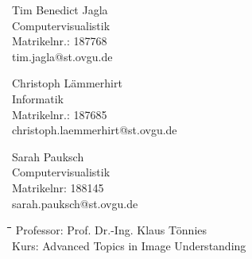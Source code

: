 \documentclass[liststotoc,11pt,a4paper]{article}
\begin{document}
\begin{figure}[htbp]
\begin{minipage}[t]{4.5cm}
\begin{flushleft}
Tim Benedict Jagla \\
Computervisualistik\\
Matrikelnr.: 187768\\ 
tim.jagla@st.ovgu.de\\
\end{flushleft}
\end{minipage}
\begin{minipage}[t]{4.8cm}
\begin{flushleft}
Christoph Lämmerhirt\\
Informatik\\
Matrikelnr.: 187685\\
christoph.laemmerhirt@st.ovgu.de\\
\end{flushleft}
\end{minipage}
\hfill
\begin{minipage}[t]{4.5cm}
\begin{flushleft} 
Sarah Pauksch\\
Computervisualistik\\
Matrikelnr: 188145\\ 
sarah.pauksch@st.ovgu.de\\
\end{flushleft}
\end{minipage}
\end{figure}

\vspace{\fill}

\begin{figure}[htbp]
\begin{minipage}[b]{0.475\textwidth}
\vspace{0pt}
\begin{flushright}    
\begin {tabbing}
\hspace*{5cm}\=\hspace{2,5cm}\=\hspace{5cm}\=\hspace{2.5cm}\=\hspace{2.5cm}\=\kill
Professor:	\>Prof. Dr.-Ing. Klaus Tönnies\\
Kurs: \>Advanced Topics in Image Understanding\\

\end{tabbing}
\end{flushright}
\end{minipage}
\hfill
\begin{minipage}[b]{0.475\textwidth}
\centering
\end{minipage}
\end{figure}
\end{document}
